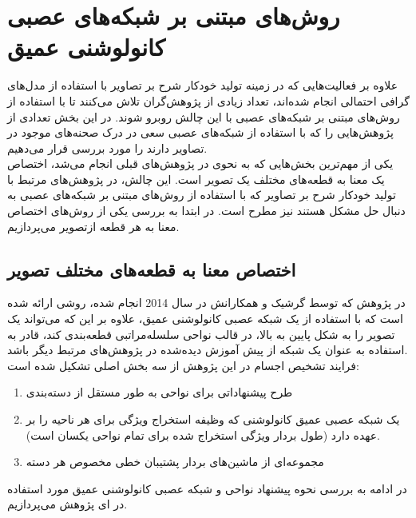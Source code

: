 \section{روش‌های مبتنی بر شبکه‌های عصبی کانولوشنی عمیق}

علاوه بر فعالیت‌هایی که در زمینه تولید خودکار شرح بر تصاویر با استفاده از مدل‌های گرافی احتمالی انجام شده‌اند، تعداد زیادی از پژوهش‌گران تلاش می‌کنند تا با استفاده از روش‌‌های مبتنی بر شبکه‌های عصبی با این چالش روبرو شوند. در این بخش تعدادی از پژوهش‌هایی را که با استفاده از شبکه‌های عصبی سعی در درک صحنه‌های موجود در تصاویر دارند را مورد بررسی قرار می‌دهیم. 
\\
یکی از مهم‌ترین بخش‌هایی که به نحوی در پژوهش‌های قبلی انجام می‌شد، اختصاص یک معنا به قطعه‌های مختلف یک تصویر است. این چالش، در پژوهش‌های مرتبط با تولید خودکار شرح بر تصاویر که با استفاده از روش‌های مبتنی بر شبکه‌های عصبی به دنبال حل مشکل هستند نیز مطرح است. در ابتدا به بررسی یکی از روش‌های اختصاص معنا به هر قطعه ازتصویر می‌پردازیم.

\subsection[اختصاص معنا به قطعه‌های مختلف تصویر]{اختصاص معنا به قطعه‌های مختلف تصویر\cite{Girshick_2014_CVPR}}
در پژوهش 
\cite{Girshick_2014_CVPR}
که توسط گرشیک و همکارانش در سال 2014 انجام شده،
روشی ارائه شده است که با استفاده از یک شبکه عصبی کانولوشنی عمیق، علاوه بر این که می‌تواند یک تصویر را به شکل پایین به بالا، در قالب نواحی سلسله‌مراتبی قطعه‌بندی کند، قادر به استفاده به عنوان یک شبکه از پیش آموزش  دیده‌شده در پژوهش‌های مرتبط دیگر باشد.
\\
فرایند تشخیص اجسام در این پژوهش از سه بخش اصلی تشکیل شده است:
\begin{enumerate}
	\item
	طرح پیشنهاداتی برای نواحی به طور مستقل از دسته‌بندی
	\item 
	یک شبکه عصبی عمیق کانولوشنی که وظیفه استخراج ویژگی برای هر ناحیه را بر عهده دارد (طول بردار ويژگی استخراج شده برای تمام نواحی یکسان است).
	\item
	مجموعه‌ای از ماشین‌های بردار پشتیبان خطی مخصوص هر دسته
\end{enumerate}
در ادامه به بررسی نحوه پیشنهاد نواحی و شبکه عصبی کانولوشنی عمیق مورد استفاده در ای پژوهش می‌پردازیم.


